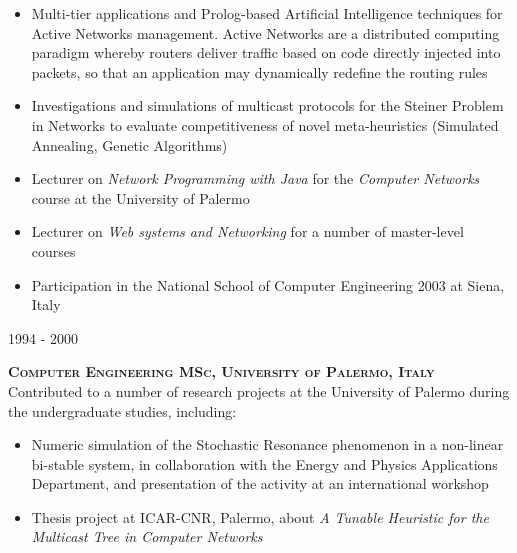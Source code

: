\documentclass[11pt]{article}
\renewcommand{\subsection}[2]%
        {
         {\bf{\raggedright \scshape #1}}{\bf{\hfill \scshape #2}}\\[-.7\baselineskip]
}
\newenvironment{CompactItemize} {
  \begin{itemize}
  \setlength{\itemsep}{-3pt}
  \setlength{\parsep}{0pt}
  \setlength{\topsep}{-2pt}
  \setlength{\partopsep}{-2pt}
} {\end{itemize}}
\begin{document}
\begin{CompactItemize}
\item Multi-tier applications and Prolog-based Artificial Intelligence techniques for Active Networks management.
  Active Networks are a distributed computing paradigm whereby routers deliver traffic based on code directly
  injected into packets, so that an application may dynamically redefine the routing rules
\item Investigations and simulations of multicast protocols for the Steiner Problem in Networks
  to evaluate competitiveness of novel meta-heuristics (Simulated Annealing, Genetic Algorithms)
\item Lecturer on \emph{Network Programming with Java} for the \emph{Computer Networks} course at the University of Palermo
\item Lecturer on \emph{Web systems and Networking} for a number of master-level courses
\item Participation in the National School of Computer Engineering 2003 at Siena, Italy
\end{CompactItemize}

\subsection{1994 - 2000}{Computer Engineering MSc, University of Palermo, Italy}

Contributed to a number of research projects at the University of Palermo during the undergraduate studies, including:

\begin{CompactItemize}
\item Numeric simulation of the Stochastic Resonance phenomenon in a non-linear bi-stable system,
  in collaboration with the Energy and Physics Applications Department, and presentation of the activity at an international workshop
\item Thesis project at ICAR-CNR, Palermo, about \emph{A Tunable Heuristic for the Multicast
  Tree in Computer Networks}
\end{CompactItemize}

%
\end{document}
